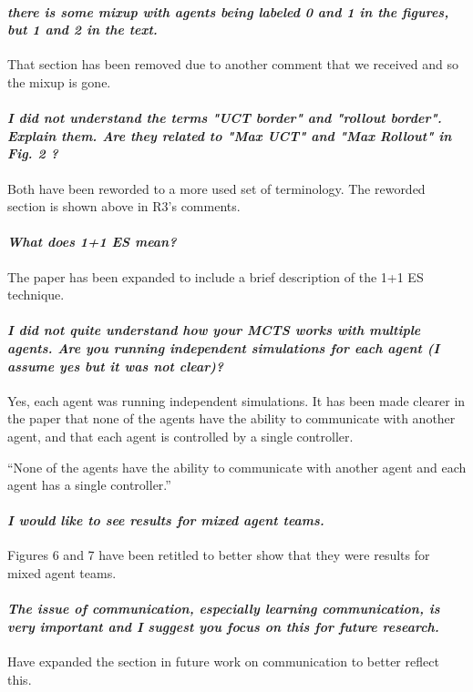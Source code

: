 \documentclass{article}
\begin{document}
\paragraph*{\textit{there is some mixup with agents being labeled 0 and 1 in the figures, but 1 and 2 in the text.}}
That section has been removed due to another comment that we received and so the mixup is gone.

\paragraph*{\textit{I did not understand the terms "UCT border" and "rollout border". Explain them. Are they related to "Max UCT" and "Max Rollout" in Fig. 2 ?}}
Both have been reworded to a more used set of terminology. The reworded section is shown above in R3's comments.
\paragraph*{\textit{What does 1+1 ES mean?}}
The paper has been expanded to include a brief description of the 1+1 ES technique.
\paragraph*{\textit{I did not quite understand how your MCTS works with multiple agents. Are you running independent simulations for each agent (I assume yes but it was not clear)? }}
Yes, each agent was running independent simulations. It has been made clearer in the paper that none of the agents have the ability to communicate with another agent, and that each agent is controlled by a single controller.

``None of the agents have the ability to communicate with another agent and each agent has a single controller.''
\paragraph*{\textit{I would like to see results for mixed agent teams.}}
Figures 6 and 7 have been retitled to better show that they were results for mixed agent teams.
\paragraph*{\textit{The issue of communication, especially learning communication, is very important and I suggest you focus on this for future research.}}
Have expanded the section in future work on communication to better reflect this.
\end{document}
